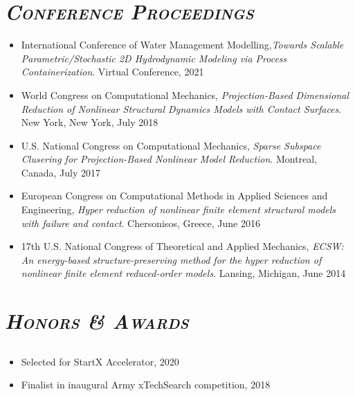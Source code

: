 \documentclass[10pt]{article}
\begin{document}
\nocite{farhat2018vibration}
\nocite{farhat2018stochastic}
\nocite{chapman2016accelerated}
\nocite{ECSW2}
\nocite{ECSW1}
\nocite{yeoh2015understanding}
\nocite{chapman2019nonlinear}
\nocite{chapman2021decentralized}
\nocite{chapman2020decentralized}
\nocite{chapman2021distributed}
\nocite{chapman2022coordinated}
\nocite{sibbach2022secure}
\printbibliography[title={\sl \bfseries{\textsc{\large Publications \& Patents}}}]

\section*{\sl {\bfseries{\textsc{\large Conference Proceedings}}}}

\begin{itemize}
\setlength{\itemsep}{0pt}
    \item {International Conference of Water Management Modelling,\emph{Towards Scalable Parametric/Stochastic 2D Hydrodynamic Modeling via Process Containerization}. Virtual Conference, 2021}
	\item {World Congress on Computational Mechanics, \emph{Projection-Based Dimensional Reduction of Nonlinear Structural Dynamics Models with Contact Surfaces}. New York, New York, July 2018}
	\item {U.S. National Congress on Computational Mechanics, \emph{Sparse Subspace Clusering for Projection-Based Nonlinear Model Reduction}. Montreal, Canada, July 2017}
	\item {European Congress on Computational Methods in Applied Sciences and Engineering, \emph{Hyper reduction of nonlinear finite element structural models with failure and contact}. Chersonisos, Greece, June 2016} 
	\item 17th U.S. National Congress of Theoretical and Applied Mechanics, \emph{ECSW: An energy-based structure-preserving method for the hyper reduction of nonlinear finite element reduced-order models}. Lansing, Michigan, June 2014
\end{itemize}

\section*{\sl {\bfseries{\textsc{\large Honors \& Awards}}}}

\subsection*{\sl \normalsize \underline{}}
\begin{itemize}
	\setlength{\itemsep}{0pt}
	\setlength{\parskip}{0pt}
	\item Selected for StartX Accelerator, 2020
	\item Finalist in inaugural Army xTechSearch competition, 2018
\end{itemize}
\end{document}
